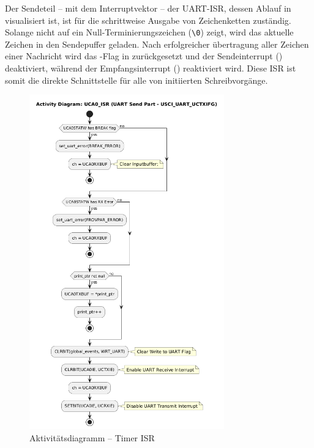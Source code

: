 Der Sendeteil -- mit dem Interruptvektor  -- der UART-ISR, dessen Ablauf in  visualisiert ist, ist f\"ur die schrittweise Ausgabe von Zeichenketten zust\"andig. Solange  nicht auf ein Null-Terminierungszeichen (\grq \texttt{\textbackslash 0}\grq) zeigt, wird das aktuelle Zeichen in den Sendepuffer  geladen. Nach erfolgreicher \"ubertragung aller Zeichen einer Nachricht wird das -Flag in  zur\"uckgesetzt und der Sendeinterrupt () deaktiviert, w\"ahrend der Empfangsinterrupt () reaktiviert wird. Diese ISR ist somit die direkte Schnittstelle f\"ur alle von  initiierten Schreibvorg\"ange.

\newpage
\begin{figure}[h!]
	\centering
	\includegraphics[width=0.75\textwidth]{../Bilder/observer_activity_diagram_eusci_send.png}
	\caption{Aktivit\"atsdiagramm -- Timer ISR}
	\label{fig:activity_diagram_uart_isr_send}
\end{figure}


